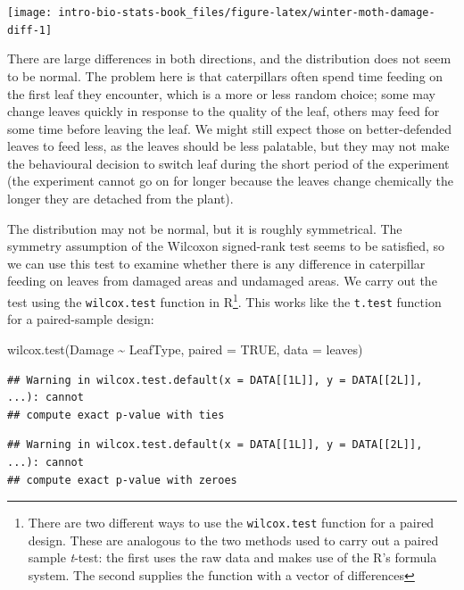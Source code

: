 \documentclass[
]{book}
\newenvironment{Shaded}{\begin{snugshade}}{\end{snugshade}}
\newcommand{\AttributeTok}[1]{\textcolor[rgb]{0.77,0.63,0.00}{#1}}
\newcommand{\ConstantTok}[1]{\textcolor[rgb]{0.00,0.00,0.00}{#1}}
\newcommand{\FunctionTok}[1]{\textcolor[rgb]{0.00,0.00,0.00}{#1}}
\newcommand{\NormalTok}[1]{#1}
\newcommand{\SpecialCharTok}[1]{\textcolor[rgb]{0.00,0.00,0.00}{#1}}
\begin{document}
\begin{center}\texttt{[image: intro-bio-stats-book\_files/figure-latex/winter-moth-damage-diff-1]} \end{center}

There are large differences in both directions, and the distribution does not seem to be normal. The problem here is that caterpillars often spend time feeding on the first leaf they encounter, which is a more or less random choice; some may change leaves quickly in response to the quality of the leaf, others may feed for some time before leaving the leaf. We might still expect those on better-defended leaves to feed less, as the leaves should be less palatable, but they may not make the behavioural decision to switch leaf during the short period of the experiment (the experiment cannot go on for longer because the leaves change chemically the longer they are detached from the plant).

The distribution may not be normal, but it is roughly symmetrical. The symmetry assumption of the Wilcoxon signed-rank test seems to be satisfied, so we can use this test to examine whether there is any difference in caterpillar feeding on leaves from damaged areas and undamaged areas. We carry out the test using the \texttt{wilcox.test} function in R\footnote{There are two different ways to use the \texttt{wilcox.test} function for a paired design. These are analogous to the two methods used to carry out a paired sample \emph{t}-test: the first uses the raw data and makes use of the R's formula system. The second supplies the function with a vector of differences}. This works like the \texttt{t.test} function for a paired-sample design:

\begin{Shaded}
\begin{Highlighting}[]
\FunctionTok{wilcox.test}\NormalTok{(Damage }\SpecialCharTok{\textasciitilde{}}\NormalTok{ LeafType, }\AttributeTok{paired =} \ConstantTok{TRUE}\NormalTok{, }\AttributeTok{data =}\NormalTok{ leaves)}
\end{Highlighting}
\end{Shaded}

\begin{verbatim}
## Warning in wilcox.test.default(x = DATA[[1L]], y = DATA[[2L]], ...): cannot
## compute exact p-value with ties
\end{verbatim}

\begin{verbatim}
## Warning in wilcox.test.default(x = DATA[[1L]], y = DATA[[2L]], ...): cannot
## compute exact p-value with zeroes
\end{verbatim}
\end{document}
